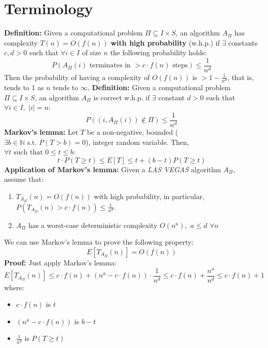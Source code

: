 \section{Terminology}
\textbf{Definition:} Given a computational problem $\Pi \subseteq I \times S$, an algorithm $A_\Pi$ has complexity $T(n) = O(f(n))$ \textbf{with high probability} (w.h.p.) if $\exists$ constants $c, d > 0$ such that $\forall i \in I$ of size $n$ the following probability holds:
\[P(A_\Pi(i)\,\, \text{terminates in $> c\cdot f(n)$ steps}) \leq \frac{1}{n^d}\]
Then the probability of having a complexity of $O(f(n))$ is $> 1 - \frac{1}{n^d}$, that is, tends to 1 as $n$ tends to $\infty$.\newline\newline
\textbf{Definition:} Given a computational problem $\Pi \subseteq I \times S$, an algorithm $A_\Pi$ is correct w.h.p. if $\exists$ constant $d > 0$ such that $\forall i \in I, \,\, |i| = n$:
\[P((i, A_\Pi(i)) \notin \Pi) \leq \frac{1}{n^d}\]
\textbf{Markov's lemma:} Let $T$ be a non-negative, bounded ($\exists b \in \mathbb{N} \,\, \text{s.t. } P(T > b) = 0$), integer random variable. Then, $\forall t \,\, \text{such that } 0 \leq t \leq b$:
\[t \cdot P(T \geq t) \leq E[T] \leq t + (b - t)P(T \geq t)\]
\textbf{Application of Markov's lemma:}
Given a \textit{LAS VEGAS} algorithm $A_\Pi$, assume that:
\begin{enumerate}
    \item $T_{A_\Pi}(n) = O(f(n))$ with high probability, in particular, $P(T_{A_\Pi}(n) > c \cdot f(n)) \leq \frac{1}{n^d}$.

    \item $A_\Pi$ has a worst-case deterministic complexity $O(n^a), \,\, a \leq d \,\, \forall n$
\end{enumerate}
We can use Markov's lemma to prove the following property:
\[E[T_{A_\Pi}(n)] = O(f(n))\]
\textbf{Proof:} Just apply Markov's lemma:
\[E[T_{A_\Pi}(n)] \leq c \cdot f(n) + (n^a - c \cdot f(n)) \cdot \frac{1}{n^d} \leq c \cdot f(n) + \frac{n^a}{n^d} \leq c \cdot f(n) + 1\]
where:
\begin{itemize}
    \item $c \cdot f(n)$ is $t$
    \item $(n^a - c \cdot f(n))$ is $b - t$
    \item $\frac{1}{n^d}$ is $P(T \geq t)$
\end{itemize}



